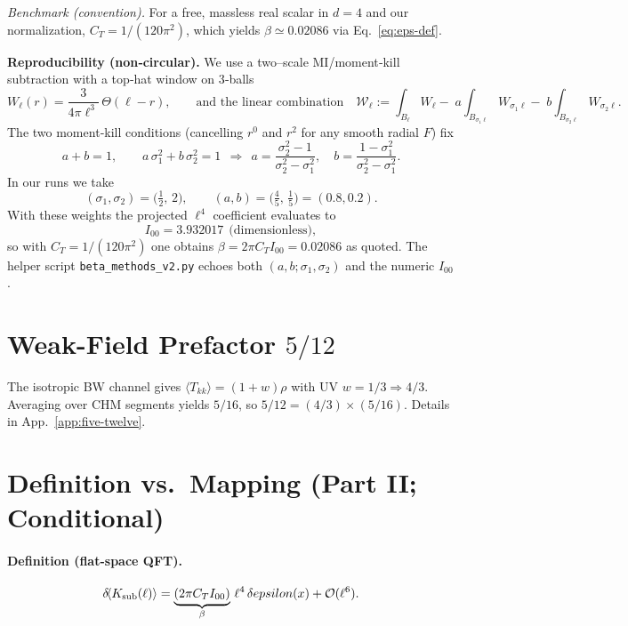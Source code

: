 \documentclass[aps,prd,onecolumn,superscriptaddress,nofootinbib]{revtex4-2}
\def\eps{epsilon}%
\providecommand{\eps}{\varepsilon}
\providecommand{\be}{\begin{equation}}
\providecommand{\ee}{\end{equation}}
\begin{document}
\noindent\emph{Benchmark (convention).} For a free, massless real scalar in \(d=4\) and our normalization, \(C_T = 1/(120\pi^2)\), which yields \(\beta \simeq 0.02086\) via Eq.~\eqref{eq:eps-def}.

\noindent\textbf{Reproducibility (non‑circular).} We use a two–scale MI/moment‑kill subtraction with a top‑hat window on 3‑balls
\[
W_\ell(r)=\frac{3}{4\pi \ell^3}\,\Theta(\ell-r),\qquad
\text{and the linear combination}\quad
\mathcal{W}_\ell:=\int_{B_\ell}\!W_\ell-\;a\!\int_{B_{\sigma_1\ell}}\!W_{\sigma_1\ell}-\;b\!\int_{B_{\sigma_2\ell}}\!W_{\sigma_2\ell}.
\]
The two moment‑kill conditions (cancelling \(r^0\) and \(r^2\) for any smooth radial \(F\)) fix
\[
a+b=1,\qquad a\,\sigma_1^2+b\,\sigma_2^2=1
\ \ \Longrightarrow\ \
a=\frac{\sigma_2^2-1}{\sigma_2^2-\sigma_1^2},\quad
b=\frac{1-\sigma_1^2}{\sigma_2^2-\sigma_1^2}.
\]
In our runs we take
\[
(\sigma_1,\sigma_2)=\Big(\tfrac{1}{2},\,2\Big),\qquad (a,b)=\Big(\tfrac{4}{5},\,\tfrac{1}{5}\Big)=(0.8,0.2).
\]
With these weights the projected \(\ell^4\) coefficient evaluates to
\[
I_{00}=3.932017\ \ \text{(dimensionless)},
\]
so with \(C_T=1/(120\pi^2)\) one obtains \(\beta=2\pi C_T I_{00}=0.02086\) as quoted. The helper script \texttt{beta\_methods\_v2.py} echoes both \((a,b;\sigma_1,\sigma_2)\) and the numeric \(I_{00}\).

\section{Weak-Field Prefactor \texorpdfstring{$5/12$}{5/12}}
\label{sec:five-twelve}
The isotropic BW channel gives \(\langle T_{kk}\rangle=(1+w)\rho\) with UV \(w=1/3\Rightarrow 4/3\).
Averaging over CHM segments yields \(5/16\), so \(5/12=(4/3)\times(5/16)\).
Details in App.~\ref{app:five-twelve}.

\section{Definition vs.\ Mapping (Part II; Conditional)}
\label{sec:def-vs-map}

\paragraph{Definition (flat-space QFT).}
\be
\label{eq:eps-def}
\delta\!\langle K_{\rm sub}(\ell)\rangle=\underbrace{(2\pi C_T I_{00})}_{\beta}\,\ell^4\,\delta\eps(x)+\mathcal O(\ell^6).
\ee
\end{document}
